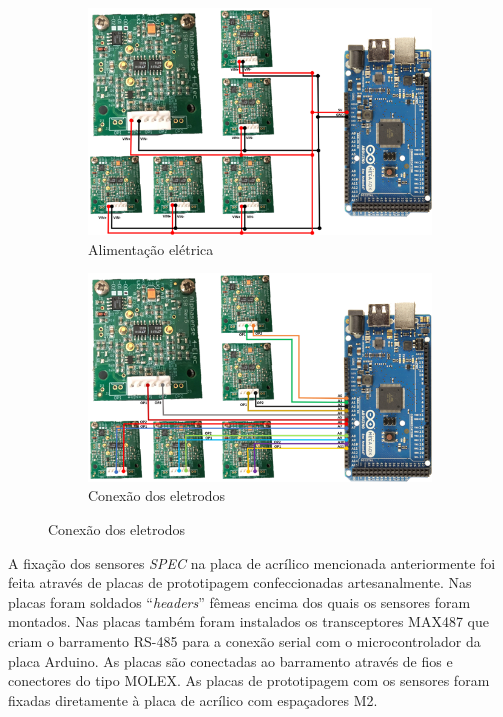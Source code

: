 \begin{figure}[h]
    \centering
    \caption{Diagrama de conexões do conjunto de sensores Alphasense}
    \begin{subfigure}{0.495\textwidth}
        \centering
        \includegraphics[width=\textwidth]{aftertext/Protótipos desenvolvidos/Figuras/Alimentação Alphasense.png}
        \caption{Alimentação elétrica}
        \label{fig:alphasense-power-supply}
    \end{subfigure}
    \hfill
    \begin{subfigure}{0.495\textwidth}
        \centering
        \includegraphics[width=\textwidth]{aftertext/Protótipos desenvolvidos/Figuras/Conexões Alphasense.png}
        \caption{Conexão dos eletrodos}
        \label{fig:alphasense-connections}
    \end{subfigure}
\end{figure}

A fixação dos sensores \textit{SPEC} na placa de acrílico mencionada anteriormente foi feita através de placas de prototipagem confeccionadas artesanalmente. Nas placas foram soldados “\textit{headers}” fêmeas encima dos quais os sensores foram montados. Nas placas também foram instalados os transceptores MAX487 que criam o barramento RS-485 para a conexão serial com o microcontrolador da placa Arduino. As placas são conectadas ao barramento através de fios e conectores do tipo MOLEX. As placas de prototipagem com os sensores foram fixadas diretamente à placa de acrílico com espaçadores M2.

